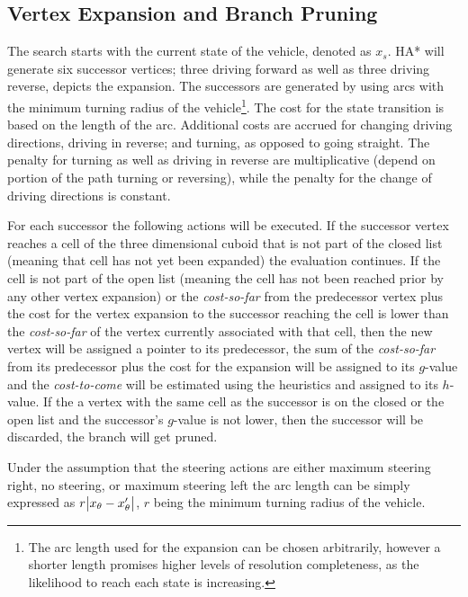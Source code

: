 \subsection{Vertex Expansion and Branch Pruning}
The search starts with the current state of the vehicle, denoted as $x_s$. HA* will generate six successor vertices; three driving forward as well as three driving reverse,  depicts the expansion. The successors are generated by using arcs with the minimum turning radius of the vehicle\footnote{The arc length used for the expansion can be chosen arbitrarily, however a shorter length promises higher levels of resolution completeness, as the likelihood to reach each state is increasing.}. The cost for the state transition is based on the length of the arc. Additional costs are accrued for changing driving directions, driving in reverse; and turning, as opposed to going straight. The penalty for turning as well as driving in reverse are multiplicative (depend on portion of the path turning or reversing), while the penalty for the change of driving directions is constant.



For each successor the following actions will be executed. If the successor vertex reaches a cell of the three dimensional cuboid that is not part of the closed list (meaning that cell has not yet been expanded) the evaluation continues. If the cell is not part of the open list (meaning the cell has not been reached prior by any other vertex expansion) or the \textit{cost-so-far} from the predecessor vertex plus the cost for the vertex expansion to the successor reaching the cell is lower than the \textit{cost-so-far} of the vertex currently associated with that cell, then the new vertex will be assigned a pointer to its predecessor, the sum of the \textit{cost-so-far} from its predecessor plus the cost for the expansion will be assigned to its $g$-value and the \textit{cost-to-come} will be estimated using the heuristics and assigned to its $h$-value. If the a vertex with the same cell as the successor is on the closed or the open list and the successor's $g$-value is not lower, then the successor will be discarded, the branch will get pruned.

Under the assumption that the steering actions are either maximum steering right, no steering, or maximum steering left the arc length can be simply expressed as $r\abs{x_\theta- x'_\theta}$, $r$ being the minimum turning radius of the vehicle.

